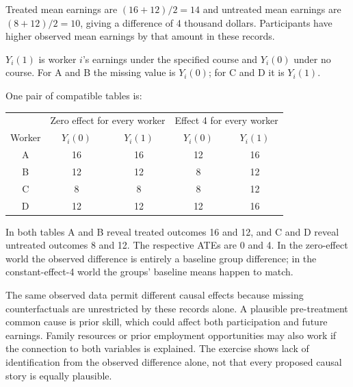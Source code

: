 \documentclass[11pt]{article}
\begin{document}
\begin{parts}
\item Treated mean earnings are $(16+12)/2=14$ and untreated mean earnings are $(8+12)/2=10$, giving a difference of 4 thousand dollars. Participants have higher observed mean earnings by that amount in these records.
\item $Y_i(1)$ is worker $i$'s earnings under the specified course and $Y_i(0)$ under no course. For A and B the missing value is $Y_i(0)$; for C and D it is $Y_i(1)$.
\item One pair of compatible tables is:
\begin{center}\begin{tabular}{ccccc}\toprule
&\multicolumn{2}{c}{Zero effect for every worker}&\multicolumn{2}{c}{Effect 4 for every worker}\\
Worker&$Y_i(0)$&$Y_i(1)$&$Y_i(0)$&$Y_i(1)$\\\midrule
A&16&16&12&16\\B&12&12&8&12\\C&8&8&8&12\\D&12&12&12&16\\\bottomrule
\end{tabular}\end{center}
In both tables A and B reveal treated outcomes 16 and 12, and C and D reveal untreated outcomes 8 and 12. The respective ATEs are 0 and 4. In the zero-effect world the observed difference is entirely a baseline group difference; in the constant-effect-4 world the groups' baseline means happen to match.
\item The same observed data permit different causal effects because missing counterfactuals are unrestricted by these records alone. A plausible pre-treatment common cause is prior skill, which could affect both participation and future earnings. Family resources or prior employment opportunities may also work if the connection to both variables is explained. The exercise shows lack of identification from the observed difference alone, not that every proposed causal story is equally plausible.
\end{parts}
\end{document}

